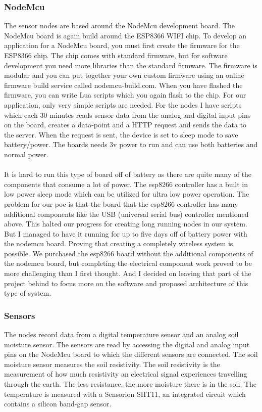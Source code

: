 \documentclass[]{uiophd}
\begin{document}
\subsubsection{NodeMcu}
The sensor nodes are based around the NodeMcu development board. The NodeMcu board is again build around the ESP8366 WIFI chip. To develop an application for a NodeMcu board, you must first create the firmware for the ESP8366 chip. The chip comes with standard firmware, but for software development you need more libraries than the standard firmware. The firmware is modular and you can put together your own custom firmware using an online firmware build service called nodemcu-build.com. When you have flashed the firmware, you can write Lua scripts which you again flash to the chip. For our application, only very simple scripts are needed. For the nodes I have scripts which each 30 minutes reads sensor data from the analog and digital input pins on the board, creates a data-point and a HTTP request and sends the data to the server. When the request is sent, the device is set to sleep mode to save battery/power. The boards needs 3v power to run and can use both batteries and normal power.
\\\\
It is hard to run this type of board off of battery as there are quite many of the components that consume a lot of power. The esp8266 controller has a built in low power sleep mode which can be utilized for ultra low power operation. The problem for our poc is that the board that the esp8266 controller has many additional components like the USB (universal serial bus) controller mentioned above. This halted our progress for creating long running nodes in our system. But I managed to have it running for up to five days off of battery power with the nodemcu board. Proving that creating a completely wireless system is possible. We purchased the esp8266 board without the additional components of the nodemcu board, but completing the electrical component work proved to be more challenging than I first thought. And I decided on leaving that part of the project behind to focus more on the software and proposed architecture of this type of system.

\subsubsection{Sensors}
The nodes record data from a digital temperature sensor and an analog soil moisture sensor. The sensors are read by accessing the digital and analog input pins on the NodeMcu board to which the different sensors are connected. The soil moisture sensor measures the soil resistivity. The soil resistivity is the measurement of how much resistivity an electrical signal experiences travelling through the earth. The less resistance, the more moisture there is in the soil. The temperature is measured with a Sensorion SHT11, an integrated circuit which contains a silicon band-gap sensor. \parencite{sensorion}
\end{document}
